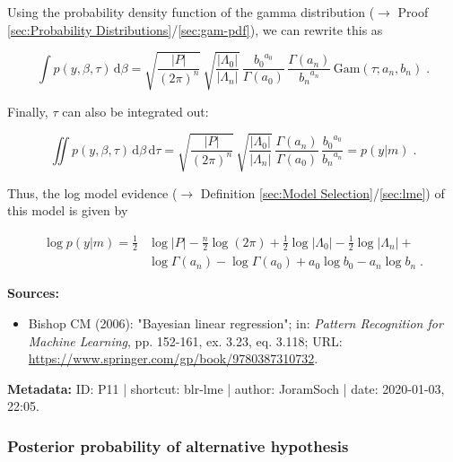 \documentclass[a4paper,12pt,twoside]{book}
\begin{document}
Using the probability density function of the gamma distribution ($\rightarrow$ Proof \ref{sec:Probability Distributions}/\ref{sec:gam-pdf}), we can rewrite this as

\begin{equation}\label{eq:blr-lme-GLM-NG-LME-s4}
\int p(y,\beta,\tau) \, \mathrm{d}\beta = \sqrt{\frac{|P|}{(2 \pi)^n}} \, \sqrt{\frac{|\Lambda_0|}{|\Lambda_n|}} \, \frac{ {b_0}^{a_0}}{\Gamma(a_0)} \, \frac{\Gamma(a_n)}{ {b_n}^{a_n}} \, \mathrm{Gam}(\tau; a_n, b_n) \; .
\end{equation}

Finally, $\tau$ can also be integrated out:

\begin{equation} \label{eq:blr-lme-GLM-NG-LME-s5}
\iint p(y,\beta,\tau) \, \mathrm{d}\beta \, \mathrm{d}\tau = \sqrt{\frac{|P|}{(2 \pi)^n}} \, \sqrt{\frac{|\Lambda_0|}{|\Lambda_n|}} \, \frac{\Gamma(a_n)}{\Gamma(a_0)} \, \frac{ {b_0}^{a_0}}{ {b_n}^{a_n}} = p(y|m) \; .
\end{equation}

Thus, the log model evidence ($\rightarrow$ Definition \ref{sec:Model Selection}/\ref{sec:lme}) of this model is given by

\begin{equation} \label{eq:blr-lme-GLM-NG-LME-s6}
\begin{split}
\log p(y|m) = \frac{1}{2} & \log |P| - \frac{n}{2} \log (2 \pi)  + \frac{1}{2} \log |\Lambda_0| - \frac{1}{2} \log |\Lambda_n| + \\
& \log \Gamma(a_n) - \log \Gamma(a_0) + a_0 \log b_0 - a_n \log b_n \; .
\end{split}
\end{equation}


\vspace{1em}
\textbf{Sources:}
\begin{itemize}
\item Bishop CM (2006): "Bayesian linear regression"; in: \textit{Pattern Recognition for Machine Learning}, pp. 152-161, ex. 3.23, eq. 3.118; URL: \url{https://www.springer.com/gp/book/9780387310732}.
\end{itemize}


\vspace{1em}
\textbf{Metadata:} ID: P11 | shortcut: blr-lme | author: JoramSoch | date: 2020-01-03, 22:05.
\vspace{1em}



\subsubsection[\textbf{Posterior probability of alternative hypothesis}]{Posterior probability of alternative hypothesis} \label{sec:blr-pp}
\setcounter{equation}{0}
\end{document}

